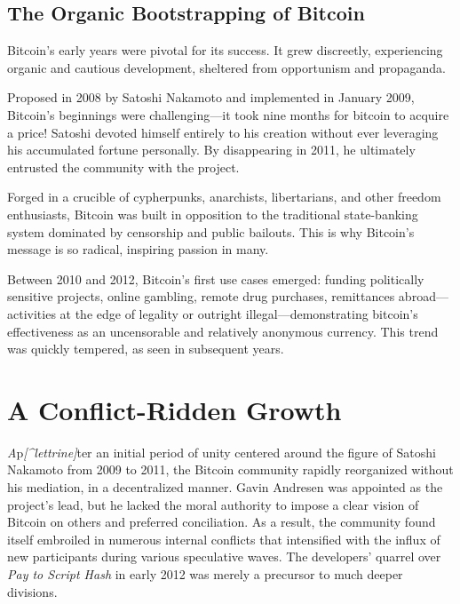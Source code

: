 \documentclass[
  a5paper,
  smalldemyvopaper,10pt,twoside,onecolumn,openright,extrafontsizes,hidelinks]{memoir}
\begin{document}
\section*{The Organic Bootstrapping of
Bitcoin}\label{lamoruxe7age-organique-de-bitcoin}


Bitcoin's early years were pivotal for its success. It grew discreetly,
experiencing organic and cautious development, sheltered from
opportunism and propaganda.

Proposed in 2008 by Satoshi Nakamoto and implemented in January 2009,
Bitcoin's beginnings were challenging---it took nine months for bitcoin
to acquire a price! Satoshi devoted himself entirely to his creation
without ever leveraging his accumulated fortune personally. By
disappearing in 2011, he ultimately entrusted the community with the
project.

Forged in a crucible of cypherpunks, anarchists, libertarians, and other
freedom enthusiasts, Bitcoin was built in opposition to the traditional
state-banking system dominated by censorship and public bailouts. This
is why Bitcoin's message is so radical, inspiring passion in many.

Between 2010 and 2012, Bitcoin's first use cases emerged: funding
politically sensitive projects, online gambling, remote drug purchases,
remittances abroad---activities at the edge of legality or outright
illegal---demonstrating bitcoin's effectiveness as an uncensorable and
relatively anonymous currency. This trend was quickly tempered, as seen
in subsequent years.


\chapter{A Conflict-Ridden Growth}\label{ch:clivages}

\label{enotezch:2}{}

\emph{A}p\emph{{[}\^{}lettrine{]}}ter an initial period of unity
centered around the figure of Satoshi Nakamoto from 2009 to 2011, the
Bitcoin community rapidly reorganized without his mediation, in a
decentralized manner. Gavin Andresen was appointed as the project's
lead, but he lacked the moral authority to impose a clear vision of
Bitcoin on others and preferred conciliation. As a result, the community
found itself embroiled in numerous internal conflicts that intensified
with the influx of new participants during various speculative waves.
The developers' quarrel over \emph{Pay to Script Hash} in early 2012 was
merely a precursor to much deeper divisions.
\end{document}
